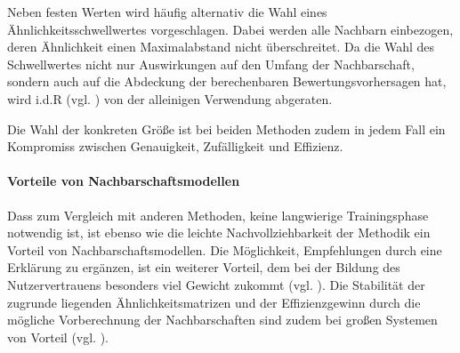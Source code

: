 Neben festen Werten wird häufig alternativ die Wahl eines Ähnlichkeitsschwellwertes vorgeschlagen. Dabei werden alle Nachbarn einbezogen, deren Ähnlichkeit einen Maximalabstand nicht überschreitet. Da die Wahl des Schwellwertes nicht nur Auswirkungen auf den Umfang der Nachbarschaft, sondern auch auf die Abdeckung der berechenbaren Bewertungsvorhersagen hat, wird i.d.R (vgl. \citep{Herlocker:2002:EAD:593967.594047, Herlocker:1999:AFP:312624.312682}) von der alleinigen Verwendung abgeraten.

Die Wahl der konkreten Größe ist bei beiden Methoden zudem in jedem Fall ein Kompromiss zwischen Genauigkeit, Zufälligkeit und Effizienz.

\paragraph{Vorteile von Nachbarschaftsmodellen} Dass zum Vergleich mit anderen Methoden, keine langwierige Trainingsphase notwendig ist, ist  ebenso wie die leichte Nachvollziehbarkeit der  Methodik ein Vorteil von Nachbarschaftsmodellen. Die Möglichkeit, Empfehlungen durch eine Erklärung zu ergänzen, ist ein weiterer Vorteil, dem bei der Bildung des Nutzervertrauens besonders viel Gewicht zukommt (vgl. \citep{hb_15}). Die Stabilität der zugrunde liegenden Ähnlichkeitsmatrizen und der Effizienzgewinn durch die mögliche Vorberechnung der Nachbarschaften sind zudem bei großen Systemen von Vorteil (vgl. \citep{linden03}).\citep{hb_04} %
